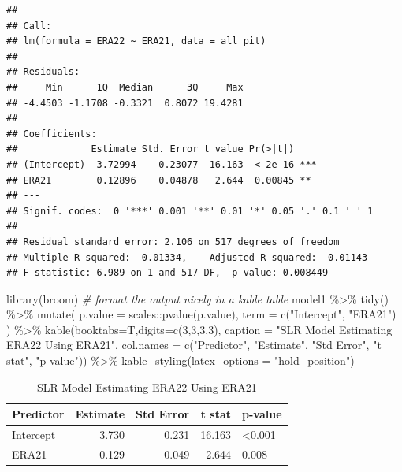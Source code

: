 \documentclass[
  11pt,
]{book}
\newenvironment{Shaded}{\begin{snugshade}}{\end{snugshade}}
\newcommand{\AttributeTok}[1]{\textcolor[rgb]{0.77,0.63,0.00}{#1}}
\newcommand{\CommentTok}[1]{\textcolor[rgb]{0.56,0.35,0.01}{\textit{#1}}}
\newcommand{\DecValTok}[1]{\textcolor[rgb]{0.00,0.00,0.81}{#1}}
\newcommand{\FunctionTok}[1]{\textcolor[rgb]{0.00,0.00,0.00}{#1}}
\newcommand{\NormalTok}[1]{#1}
\newcommand{\SpecialCharTok}[1]{\textcolor[rgb]{0.00,0.00,0.00}{#1}}
\newcommand{\StringTok}[1]{\textcolor[rgb]{0.31,0.60,0.02}{#1}}
\theoremstyle{definition}
\theoremstyle{definition}
\theoremstyle{definition}
\theoremstyle{definition}
\theoremstyle{remark}
\begin{document}
\begin{verbatim}
## 
## Call:
## lm(formula = ERA22 ~ ERA21, data = all_pit)
## 
## Residuals:
##     Min      1Q  Median      3Q     Max 
## -4.4503 -1.1708 -0.3321  0.8072 19.4281 
## 
## Coefficients:
##             Estimate Std. Error t value Pr(>|t|)    
## (Intercept)  3.72994    0.23077  16.163  < 2e-16 ***
## ERA21        0.12896    0.04878   2.644  0.00845 ** 
## ---
## Signif. codes:  0 '***' 0.001 '**' 0.01 '*' 0.05 '.' 0.1 ' ' 1
## 
## Residual standard error: 2.106 on 517 degrees of freedom
## Multiple R-squared:  0.01334,    Adjusted R-squared:  0.01143 
## F-statistic: 6.989 on 1 and 517 DF,  p-value: 0.008449
\end{verbatim}

\begin{Shaded}
\begin{Highlighting}[]
\FunctionTok{library}\NormalTok{(broom)}
\CommentTok{\# format the output nicely in a kable table}
\NormalTok{model1 }\SpecialCharTok{\%\textgreater{}\%} \FunctionTok{tidy}\NormalTok{() }\SpecialCharTok{\%\textgreater{}\%}
  \FunctionTok{mutate}\NormalTok{(}
    \AttributeTok{p.value =}\NormalTok{ scales}\SpecialCharTok{::}\FunctionTok{pvalue}\NormalTok{(p.value),}
    \AttributeTok{term =} \FunctionTok{c}\NormalTok{(}\StringTok{"Intercept"}\NormalTok{, }\StringTok{"ERA21"}\NormalTok{)}
\NormalTok{  ) }\SpecialCharTok{\%\textgreater{}\%}
  \FunctionTok{kable}\NormalTok{(}\AttributeTok{booktabs=}\NormalTok{T,}\AttributeTok{digits=}\FunctionTok{c}\NormalTok{(}\DecValTok{3}\NormalTok{,}\DecValTok{3}\NormalTok{,}\DecValTok{3}\NormalTok{,}\DecValTok{3}\NormalTok{), }
        \AttributeTok{caption =} \StringTok{"SLR Model Estimating ERA22 Using ERA21"}\NormalTok{,}
        \AttributeTok{col.names =} \FunctionTok{c}\NormalTok{(}\StringTok{"Predictor"}\NormalTok{, }\StringTok{"Estimate"}\NormalTok{, }\StringTok{"Std Error"}\NormalTok{, }\StringTok{"t stat"}\NormalTok{, }\StringTok{"p{-}value"}\NormalTok{)) }\SpecialCharTok{\%\textgreater{}\%}
  \FunctionTok{kable\_styling}\NormalTok{(}\AttributeTok{latex\_options =} \StringTok{"hold\_position"}\NormalTok{)}
\end{Highlighting}
\end{Shaded}

\begin{table}[!h]

\caption{\label{tab:unnamed-chunk-188}SLR Model Estimating ERA22 Using ERA21}
\centering
\begin{tabular}[t]{lrrrl}
\toprule
Predictor & Estimate & Std Error & t stat & p-value\\
\midrule
Intercept & 3.730 & 0.231 & 16.163 & <0.001\\
ERA21 & 0.129 & 0.049 & 2.644 & 0.008\\
\bottomrule
\end{tabular}
\end{table}
\end{document}
